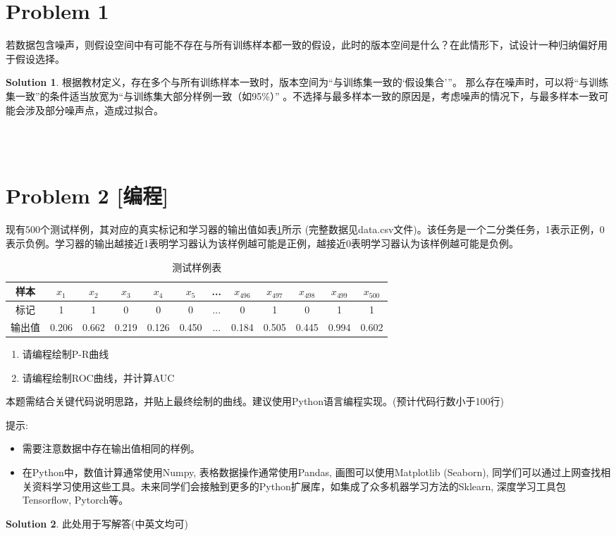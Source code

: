 \documentclass[a4paper,UTF8]{article}
\theoremstyle{definition}
\newtheorem*{solution}{Solution}
\begin{document}
\newpage
\section*{Problem 1}
若数据包含噪声，则假设空间中有可能不存在与所有训练样本都一致的假设，此时的版本空间是什么？在此情形下，试设计一种归纳偏好用于假设选择。
\begin{solution}

根据教材定义，存在多个与所有训练样本一致时，版本空间为“与训练集一致的‘假设集合’”。
那么存在噪声时，可以将“与训练集一致”的条件适当放宽为“与训练集大部分样例一致（如95\%）” 。不选择与最多样本一致的原因是，考虑噪声的情况下，与最多样本一致可能会涉及部分噪声点，造成过拟合。


~\\
~\\
\end{solution}

\section*{Problem 2 [编程]} 
现有500个测试样例，其对应的真实标记和学习器的输出值如表\ref{table:roc}所示 (完整数据见data.csv文件)。该任务是一个二分类任务，1表示正例，0表示负例。学习器的输出越接近1表明学习器认为该样例越可能是正例，越接近0表明学习器认为该样例越可能是负例。
\begin{table}[!h]
	\centering
	\caption{测试样例表} \vspace{2mm}\label{table:roc}
	\begin{tabular}{c|c c c c c c c c c c c}\hline
		样本 & $x_1$ & $x_2$ & $x_3$  & $x_4$  & $x_5$&...& $x_{496}$& $x_{497}$ & $x_{498}$ & $x_{499}$ & $x_{500}$ \\
		\hline
		标记 & 1  & 1 &  0 &  0  & 0 &... &0& 1 & 0 & 1 & 1\\
		\hline
		输出值 & 0.206  & 0.662 &  0.219 &  0.126  & 0.450 & ... & 0.184&0.505 & 0.445 & 0.994 & 0.602\\
		\hline
	\end{tabular}
\end{table}
\begin{enumerate}[ {(}1{)}]
\item 请编程绘制P-R曲线
\item 请编程绘制ROC曲线，并计算AUC
\end{enumerate}
本题需结合关键代码说明思路，并贴上最终绘制的曲线。建议使用Python语言编程实现。(预计代码行数小于100行)

提示:
\begin{itemize}
	\item 需要注意数据中存在输出值相同的样例。
	\item 
	在Python中，数值计算通常使用Numpy, 表格数据操作通常使用Pandas, 画图可以使用Matplotlib (Seaborn), 同学们可以通过上网查找相关资料学习使用这些工具。未来同学们会接触到更多的Python扩展库，如集成了众多机器学习方法的Sklearn, 深度学习工具包Tensorflow, Pytorch等。
\end{itemize}
\begin{solution}
此处用于写解答(中英文均可)	
\end{solution}
\end{document}
